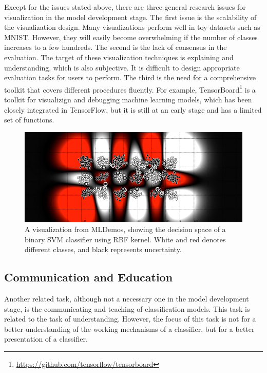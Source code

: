 Except for the issues stated above, there are three general research issues for visualization in the model development stage. The first issue is the scalability of the visualization design. Many visualizations perform well in toy datasets such as MNIST. However, they will easily become overwhelming if the number of classes increases to a few hundreds. The second is the lack of consensus in the evaluation. The target of these visualization techniques is explaining and understanding, which is also subjective. It is difficult to design appropriate evaluation tasks for users to perform. The third is the need for a comprehensive toolkit that covers different procedures fluently. For example, TensorBoard\footnote{\url{https://github.com/tensorflow/tensorboard}} is a toolkit for visualizign and debugging machine learning models, which has been closely integrated in TensorFlow, but it is still at an early stage and has a limited set of functions.

\begin{figure}[bt]
    \centering
    \includegraphics[width=1.0\textwidth]{figure/svm-rbf-points}
    \caption{A visualization from MLDemos, showing the decision space of a binary SVM classifier using RBF kernel. White and red denotes different classes, and black represents uncertainty.}
    \label{fig:mldemos}
\end{figure}

\subsection{Communication and Education}

Another related task, although not a necessary one in the model development stage, is the communicating and teaching of classification models. This task is related to the task of understanding. However, the focus of this task is not for a better understanding of the working mechanisms of a classifier, but for a better presentation of a classifier. 

